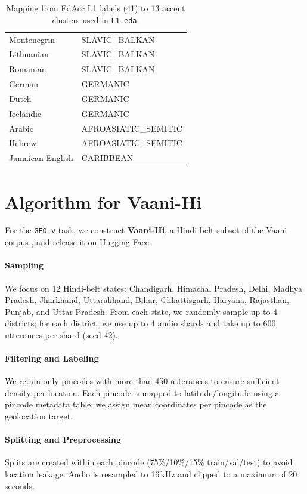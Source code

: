 \begin{table}[t]
\begin{tabular}{l l}
Montenegrin & SLAVIC\_BALKAN \\
Lithuanian & SLAVIC\_BALKAN \\
Romanian & SLAVIC\_BALKAN \\
\midrule
German & GERMANIC \\
Dutch & GERMANIC \\
Icelandic & GERMANIC \\
\midrule
Arabic & AFROASIATIC\_SEMITIC \\
Hebrew & AFROASIATIC\_SEMITIC \\
\midrule
Jamaican English & CARIBBEAN \\
\bottomrule
\end{tabular}
\caption{Mapping from EdAcc L1 labels (41) to 13 accent clusters used in \texttt{L1-eda}.}
\label{tab:edacc-l1-accent-mapping}
\end{table}

\section{Algorithm for Vaani-Hi}
\label{appendix:vaani}

For the \texttt{GEO-v} task, we construct \textbf{Vaani-Hi}, a Hindi-belt subset of the Vaani corpus \citep{vaani2025}, and release it on Hugging Face.

\paragraph{Sampling}
We focus on 12 Hindi-belt states: Chandigarh, Himachal Pradesh, Delhi, Madhya Pradesh, Jharkhand, Uttarakhand, Bihar, Chhattisgarh, Haryana, Rajasthan, Punjab, and Uttar Pradesh.
From each state, we randomly sample up to 4 districts; for each district, we use up to 4 audio shards and take up to 600 utterances per shard (seed 42).

\paragraph{Filtering and Labeling}
We retain only pincodes with more than 450 utterances to ensure sufficient density per location.
Each pincode is mapped to latitude/longitude using a pincode metadata table; we assign mean coordinates per pincode as the geolocation target.

\paragraph{Splitting and Preprocessing}
Splits are created within each pincode (75\%/10\%/15\% train/val/test) to avoid location leakage.
Audio is resampled to 16\,kHz and clipped to a maximum of 20 seconds.


